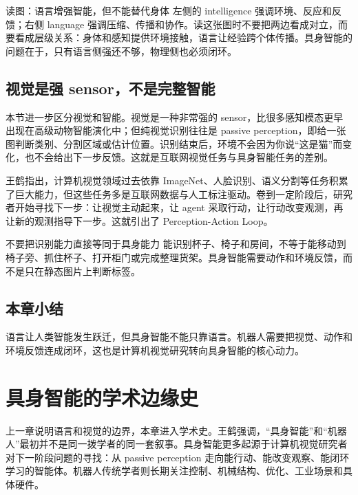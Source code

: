 \documentclass[a4paper]{article}
\begin{document}
\begin{knowledgebox}{读图：语言增强智能，但不能替代身体}
左侧的 intelligence 强调环境、反应和反馈；右侧 language 强调压缩、传播和协作。读这张图时不要把两边看成对立，而要看成层级关系：身体和感知提供环境接触，语言让经验跨个体传播。具身智能的问题在于，只有语言侧强还不够，物理侧也必须闭环。
\end{knowledgebox}

\subsection{视觉是强 sensor，不是完整智能}

本节进一步区分视觉和智能。视觉是一种非常强的 sensor，比很多感知模态更早出现在高级动物智能演化中；但纯视觉识别往往是 passive perception，即给一张图判断类别、分割区域或估计位置。识别结束后，环境不会因为你说“这是猫”而变化，也不会给出下一步反馈。这就是互联网视觉任务与具身智能任务的差别。

王鹤指出，计算机视觉领域过去依靠 ImageNet、人脸识别、语义分割等任务积累了巨大能力，但这些任务多是互联网数据与人工标注驱动。卷到一定阶段后，研究者开始寻找下一步：让视觉主动起来，让 agent 采取行动，让行动改变观测，再让新的观测指导下一步。这就引出了 Perception-Action Loop。

\begin{warningbox}{不要把识别能力直接等同于具身能力}
能识别杯子、椅子和房间，不等于能移动到椅子旁、抓住杯子、打开柜门或完成整理货架。具身智能需要动作和环境反馈，而不是只在静态图片上判断标签。
\end{warningbox}

\subsection{本章小结}

语言让人类智能发生跃迁，但具身智能不能只靠语言。机器人需要把视觉、动作和环境反馈连成闭环，这也是计算机视觉研究转向具身智能的核心动力。

\section{具身智能的学术边缘史}

上一章说明语言和视觉的边界，本章进入学术史。王鹤强调，“具身智能”和“机器人”最初并不是同一拨学者的同一套叙事。具身智能更多起源于计算机视觉研究者对下一阶段问题的寻找：从 passive perception 走向能行动、能改变观察、能闭环学习的智能体。机器人传统学者则长期关注控制、机械结构、优化、工业场景和具体硬件。
\end{document}

